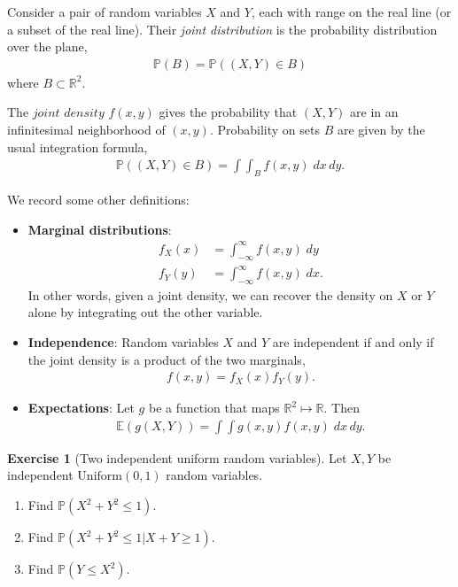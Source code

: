\documentclass[11pt]{article}
\theoremstyle{definition}
\newtheorem{exercise}[]{Exercise}
\renewcommand{\P}{\mathbb{P}}
\newcommand{\E}{\mathbb{E}}
\newcommand{\R}{\mathbb{R}}
\begin{document}
Consider a pair of random variables $X$ and $Y$, each
with range on the real line (or a subset of the real line).
Their \textit{joint distribution} is the probability distribution over the plane,
\begin{align*}
  \P(B) = \P((X, Y) \in B)
\end{align*}
where $B\subset\R^2$.

The $\textit{joint density}$ $f(x, y)$ gives the
probability that $(X,Y)$ are in an
infinitesimal neighborhood of $(x, y)$. Probability
on sets $B$ are given by the usual integration formula,
\begin{align*}
  \P((X, Y)\in B) = \int\int_B f(x,y)\; dx\,dy.
\end{align*}

We record some other definitions:
\begin{itemize}
  \item \textbf{Marginal distributions}:
  \begin{align*}
    f_X(x) &= \int_{-\infty}^\infty f(x, y)\; dy \\
    f_Y(y) &= \int_{-\infty}^\infty f(x, y)\; dx.
  \end{align*}
  In other words, given a joint density, we can recover
  the density on $X$ or $Y$ alone by integrating out
  the other variable.
  \item \textbf{Independence}:
  Random variables $X$ and $Y$ are independent if and only if the joint density is a product of the two marginals,
  \begin{align*}
    f(x, y) = f_X(x) f_Y(y).
  \end{align*}
  \item \textbf{Expectations}: Let $g$ be a function that maps $\R^2\mapsto \R$. Then
  \begin{align*}
    \E(g(X, Y)) = \int\int g(x, y) f(x, y)\; dx\, dy.
  \end{align*}
\end{itemize}


\begin{exercise}[Two independent uniform random variables]
Let $X, Y$ be independent $\text{Uniform}(0, 1)$ random variables.
\begin{enumerate}[label = (\alph*)]
  \item Find $\P(X^2 + Y^2 \leq 1)$.
  \item Find $\P(X^2 + Y^2 \leq 1 | X + Y \geq 1)$.
  \item Find $\P(Y \leq X^2)$.
\end{enumerate}
\end{exercise}
\end{document}
